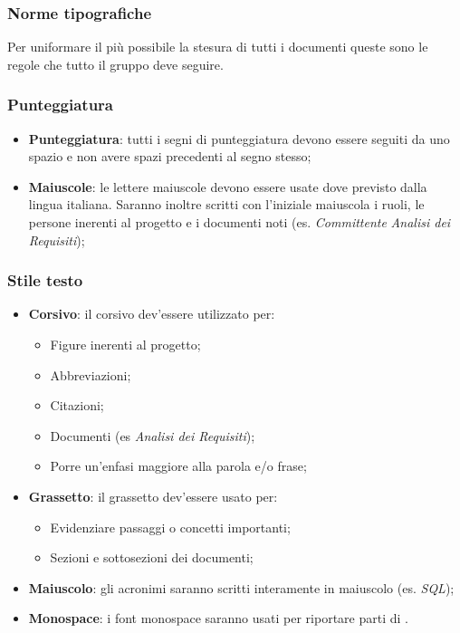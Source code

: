 \documentclass{scalatekids-article}
\begin{document}
\subsubsection{Norme tipografiche}

Per uniformare il più possibile la stesura di tutti i documenti queste sono le regole che tutto il gruppo deve seguire.

\subsubsection{Punteggiatura}

\begin{itemize}
    \item \textbf{Punteggiatura}: tutti i segni di punteggiatura devono essere seguiti da uno spazio e non avere spazi precedenti al segno stesso;
    \item \textbf{Maiuscole}: le lettere maiuscole devono essere usate dove previsto dalla lingua italiana.
        Saranno inoltre scritti con l'iniziale maiuscola i ruoli, le persone inerenti al progetto e i documenti noti (es. \textit{Committente} \textit{Analisi dei Requisiti});
\end{itemize}

\subsubsection{Stile testo}

\begin{itemize}
    \item \textbf{Corsivo}: il corsivo dev'essere utilizzato per:
        \begin{itemize}
            \item Figure inerenti al progetto;
            \item Abbreviazioni;
            \item Citazioni;
            \item Documenti (es \textit{Analisi dei Requisiti});
            \item Porre un'enfasi maggiore alla parola e/o frase;
        \end{itemize}
    \item \textbf{Grassetto}: il grassetto dev'essere usato per:
        \begin{itemize}
            \item Evidenziare passaggi o concetti importanti;
            \item Sezioni e sottosezioni dei documenti;
        \end{itemize}
    \item \textbf{Maiuscolo}: gli acronimi saranno scritti interamente in maiuscolo (es. \textit{SQL});
    \item \textbf{Monospace}: i font monospace saranno usati per riportare parti di .
\end{itemize}
\end{document}
